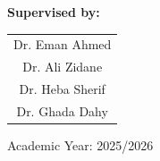 \documentclass[12pt, a4paper]{report}
\begin{document}
\begin{titlepage}
\begin{center}
        \textbf{Supervised by:} \\
        \begin{tabular}{c}
            Dr. Eman Ahmed \\
            Dr. Ali Zidane \\
            Dr. Heba Sherif \\
            Dr. Ghada Dahy \\
        \end{tabular}
        \vfill
        
        Academic Year: 2025/2026
        
    \end{center}
\end{titlepage}


\tableofcontents
\newpage

\listoffigures
\newpage

\listoftables
\newpage

\end{document}
